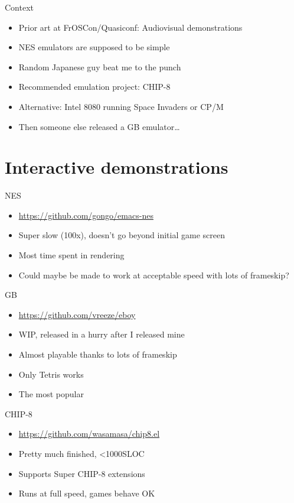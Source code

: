 \documentclass[presentation]{beamer}
\begin{document}
\begin{frame}[label={sec:org83df2d0}]{Context}
\begin{itemize}
\item Prior art at FrOSCon/Quasiconf: Audiovisual demonstrations
\item NES emulators are supposed to be simple
\item Random Japanese guy beat me to the punch
\item Recommended emulation project: CHIP-8
\item Alternative: Intel 8080 running Space Invaders or CP/M
\item Then someone else released a GB emulator\ldots{}
\end{itemize}
\end{frame}

\section{Interactive demonstrations}
\label{sec:org3894488}

\begin{frame}[label={sec:org57a0a33}]{NES}
\begin{itemize}
\item \url{https://github.com/gongo/emacs-nes}
\item Super slow (100x), doesn't go beyond initial game screen
\item Most time spent in rendering
\item Could maybe be made to work at acceptable speed with lots of
frameskip?
\end{itemize}
\end{frame}

\begin{frame}[label={sec:orgdd660d9}]{GB}
\begin{itemize}
\item \url{https://github.com/vreeze/eboy}
\item WIP, released in a hurry after I released mine
\item Almost playable thanks to lots of frameskip
\item Only Tetris works
\item The most popular
\end{itemize}
\end{frame}

\begin{frame}[label={sec:orgec8c7ef}]{CHIP-8}
\begin{itemize}
\item \url{https://github.com/wasamasa/chip8.el}
\item Pretty much finished, <1000SLOC
\item Supports Super CHIP-8 extensions
\item Runs at full speed, games behave OK
\end{itemize}
\end{frame}
\end{document}
